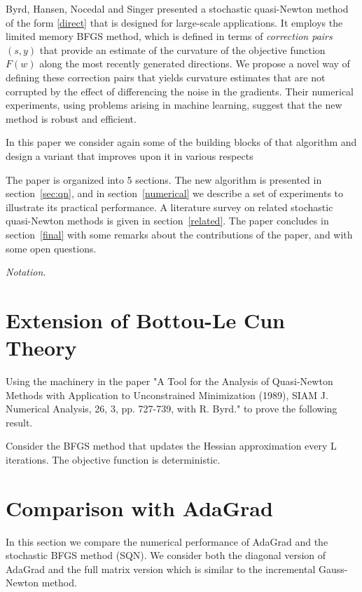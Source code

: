 \documentclass[12pt]{article}
\begin{document}
Byrd, Hansen, Nocedal and Singer \cite{sammy} presented a stochastic quasi-Newton method of the form \eqref{direct} that is designed for large-scale applications. It employs the limited memory BFGS method, which is defined in terms of \emph{correction pairs} $(s, y)$ that provide an estimate of the curvature of the objective function $F(w)$ along the most recently generated directions. We propose a novel way of defining these correction pairs that yields curvature estimates that are not corrupted by the effect 
of differencing the noise in the gradients. Their numerical experiments, using problems arising in machine learning, suggest that the new method is robust and efficient.

In this paper we consider again some of the building blocks of that algorithm and design a variant that improves upon it in various respects

The paper is organized into 5 sections. The new algorithm is presented in section~\ref{sec:qn}, and in section~\ref{numerical} we describe a set of experiments to illustrate its practical performance. 
A literature survey on  related stochastic quasi-Newton methods is given in section~\ref{related}. The paper concludes in section~\ref{final} with some remarks about the contributions of the paper, and with some open questions.
 
\bigskip\noindent\emph{Notation.}  

\section{Extension of Bottou-Le Cun Theory}
\label{ext}

Using the machinery in the paper "A Tool for the Analysis of Quasi-Newton Methods with Application to Unconstrained 
Minimization (1989), SIAM J. Numerical Analysis, 26, 3, pp. 727-739, with R. Byrd." to prove the following result.

Consider the BFGS method that updates the Hessian approximation every L iterations. The objective function is deterministic.
\section{Comparison with AdaGrad}
\label{adagrad}
In this section we compare the numerical performance of AdaGrad and the stochastic BFGS method (SQN). We consider both the diagonal version of AdaGrad and the full matrix version which is similar to the incremental Gauss-Newton method.
\end{document}
